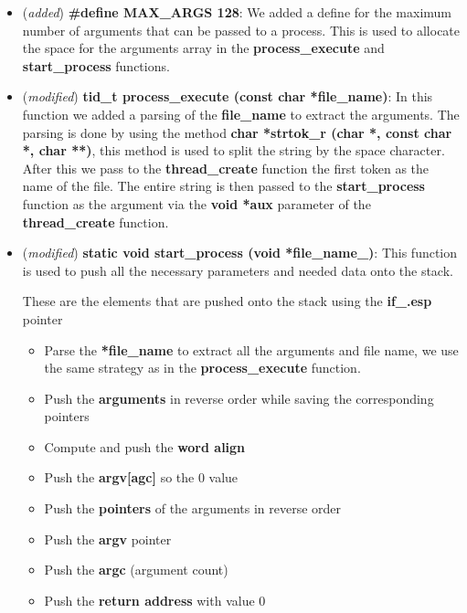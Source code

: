 \documentclass[11pt]{scrartcl}
\begin{document}
\begin{itemize}
    \item (\textit{added}) \textbf{\#define MAX\_ARGS 128}:
          We added a define for the maximum number of arguments that can be passed to a process.
          This is used to allocate the space for the arguments array in the \textbf{process\_execute} and \textbf{start\_process} functions.

    \item (\textit{modified}) \textbf{tid\_t process\_execute (const char *file\_name)}:
          In this function we added a parsing of the \textbf{file\_name} to extract the arguments.
          The parsing is done by using the method \textbf{char *strtok\_r (char *, const char *, char **)}, this method is used to split the string by the space character.
          After this we pass to the \textbf{thread\_create} function the first token as the name of the file.
          The entire string is then passed to the \textbf{start\_process} function as the argument via the \textbf{void *aux} parameter of the \textbf{thread\_create} function.

    \item (\textit{modified}) \textbf{static void start\_process (void *file\_name\_)}:
          This function is used to push all the necessary parameters and needed data onto the stack.

          These are the elements that are pushed onto the stack using the \textbf{if\_.esp} pointer
          \begin{itemize}
              \item Parse the \textbf{*file\_name} to extract all the arguments and file name, we use the same strategy as in the \textbf{process\_execute} function.
              \item Push the \textbf{arguments} in reverse order while saving the corresponding pointers
              \item Compute and push the \textbf{word align}
              \item Push the \textbf{argv[agc]} so the 0 value
              \item Push the \textbf{pointers} of the arguments in reverse order
              \item Push the \textbf{argv} pointer
              \item Push the \textbf{argc} (argument count)
              \item Push the \textbf{return address} with value 0
          \end{itemize}


\end{itemize}
\end{document}
